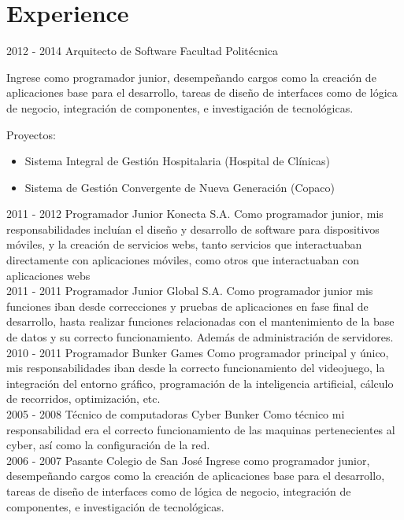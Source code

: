 \documentclass[]{friggeri-cv}
\begin{document}
\section{Experience}
\begin{entrylist}
  \entry
    {2012 - 2014}
    {Arquitecto de Software}
    {Facultad Politécnica}
    { Ingrese como programador junior, desempeñando cargos como la creación de
        aplicaciones base para el desarrollo, tareas de diseño de interfaces
        como de lógica de negocio, integración de componentes, e investigación
        de tecnológicas.

        Proyectos:
        \begin{itemize}
            \item Sistema Integral de Gestión Hospitalaria (Hospital de
                Clínicas)
            \item Sistema de Gestión Convergente de Nueva Generación (Copaco)
        \end{itemize}}
\entry
    {2011 - 2012}
    {Programador Junior}
    {Konecta S.A.}
    {Como programador junior, mis responsabilidades incluían el diseño y
        desarrollo de software para dispositivos móviles, y la creación de
        servicios webs, tanto servicios que interactuaban directamente con
        aplicaciones móviles, como otros que interactuaban con aplicaciones webs
        \\}
\entry
    {2011 - 2011}
    {Programador Junior}
    {Global S.A.}
    {Como programador junior mis funciones iban desde correcciones y pruebas de
        aplicaciones en fase final de desarrollo, hasta realizar funciones
        relacionadas con el mantenimiento de la base de datos y su correcto
        funcionamiento. Además de administración de servidores. \\}
\entry
    {2010 - 2011}
    {Programador}
    {Bunker Games}
    {Como programador principal y único, mis responsabilidades iban desde la
        correcto funcionamiento del videojuego, la integración del entorno
        gráfico, programación de la inteligencia artificial, cálculo de
        recorridos, optimización, etc. \\}
\entry
    {2005 - 2008}
    {Técnico de computadoras}
    {Cyber Bunker}
    {Como técnico mi responsabilidad era el correcto funcionamiento de las
        maquinas pertenecientes al cyber, así como la configuración de la red.
        \\}
\entry
    {2006 - 2007}
    {Pasante}
    {Colegio de San José}
    {Ingrese como programador junior, desempeñando cargos como la
creación de aplicaciones base para el desarrollo, tareas de diseño de
interfaces como de lógica de negocio, integración de componentes, e
investigación de tecnológicas. \\}

\end{entrylist}
\end{document}
